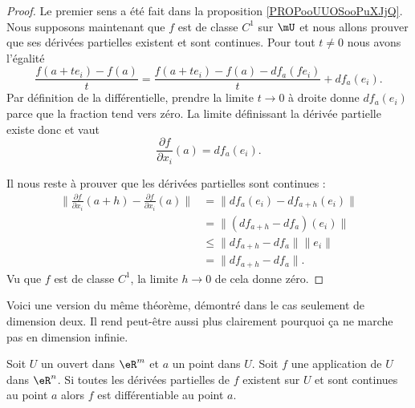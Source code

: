 \begin{proof}
    Le premier sens a été fait dans la proposition \ref{PROPooUUOSooPuXJjQ}. Nous supposons maintenant que \( f\) est de classe \( C^1\) sur \( \mU\) et nous allons prouver que ses dérivées partielles existent et sont continues. Pour tout \( t\neq 0\) nous avons l'égalité
    \begin{equation}
        \frac{ f(a+te_i)-f(a) }{ t }=\frac{ f(a+te_i)-f(a)-df_a(fe_i) }{ t }+df_a(e_i).
    \end{equation}
    Par définition de la différentielle, prendre la limite \( t\to 0\) à droite donne \( df_a(e_i)\) parce que la fraction tend vers zéro. La limite définissant la dérivée partielle existe donc et vaut
    \begin{equation}
        \frac{ \partial f }{ \partial x_i }(a)=df_a(e_i).
    \end{equation}
    
    Il nous reste à prouver que les dérivées partielles sont continues :
    \begin{subequations}
        \begin{align}
            \| \frac{ \partial f }{ \partial x_i }(a+h)-\frac{ \partial f }{ \partial x_i }(a) \|&=\| df_{a}(e_i)-df_{a+h}(e_i) \|\\
            &=\| (df_{a+h}-df_a)(e_i) \|\\
            &\leq \| df_{a+h}-df_a \|\| e_i \|\\
            &= \| df_{a+h}-df_a \|.
        \end{align}
    \end{subequations}
    Vu que \( f\) est de classe \( C^1\), la limite \( h\to 0\) de cela donne zéro.
\end{proof}

Voici une version du même théorème, démontré dans le cas seulement de dimension deux. Il rend peut-être aussi plus clairement pourquoi ça ne marche pas en dimension infinie.

\begin{proposition}		\label{Diff_totale}     %
    Soit $U$ un ouvert dans $\eR^m$ et $a$ un point dans $U$. Soit $f$ une application de $U$ dans $\eR^n$. Si toutes les dérivées partielles de $f$ existent sur \( U\) et sont continues au point $a$ alors $f$ est différentiable au point $a$.
\end{proposition}

